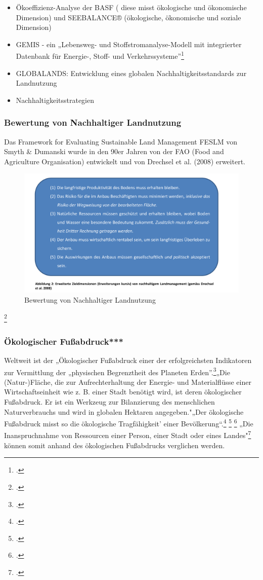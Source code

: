 \documentclass{scrartcl}
\begin{document}
\begin{itemize}
\item Ökoeffizienz-Analyse der BASF ( diese misst ökologische und ökonomische Dimension) und SEEBALANCE® (ökologische, ökonomische und soziale Dimension)
\item GEMIS - ein „Lebensweg- und Stoffstromanalyse-Modell mit integrierter Datenbank für Energie-, Stoff- und Verkehrssysteme”\footcite{}
\item GLOBALANDS: Entwicklung eines globalen Nachhaltigkeitsstandards zur Landnutzung
\item Nachhaltigkeitsstrategien
\end{itemize}

\subsubsection{Bewertung von Nachhaltiger Landnutzung}
Das Framework for Evaluating Sustainable Land Management FESLM von Smyth \& Dumanski wurde in den 90er Jahren von der FAO (Food and Agriculture Organisation) entwickelt und von Drechsel et al. (2008) erweitert.
\begin{figure}[htbp]
\centering
\includegraphics[width=12cm]{image_folder/drechsel.png}
\caption{Bewertung von Nachhaltiger Landnutzung}
\label{fig:Bewertung von Nachhaltiger Landnutzung}
\end{figure}\footcite{TobiasSpringDerBasel-Stadt, S.17}

\subsubsection{Ökologischer Fußabdruck***}
Weltweit ist der „Ökologischer Fußabdruck einer der erfolgreichsten Indikatoren zur Vermittlung der „physischen Begrenztheit des Planeten Erden”.\footcite[S.2]{StefanGiljum2007WissenschaftlicheFuabdruck}„Die (Natur-)Fläche, die zur Aufrechterhaltung der Energie- und Materialflüsse einer Wirtschaftseinheit wie z. B. einer Stadt benötigt wird, ist deren ökologischer Fußabdruck. Er ist ein Werkzeug zur Bilanzierung des menschlichen Naturverbrauchs und wird in globalen Hektaren angegeben."„Der ökologische Fußabdruck misst so die ökologische Tragfähigkeit’ einer Bevölkerung“.\footcite[S. 25]{MathisWackernagelUnserNimmt} \footcite[S.5]{MichelsenGrundlagenEntwicklung} 
\footcite[Vgl.][S.23ff]{MathisWackernagelUnserNimmt}
„Die Inanspruchnahme von Ressourcen einer Person, einer Stadt oder eines Landes"\footcite[S.192]{AntjeFlade2015StadtStadtforschung} können somit anhand des ökologischen Fußabdrucks verglichen werden. 
\end{document}
